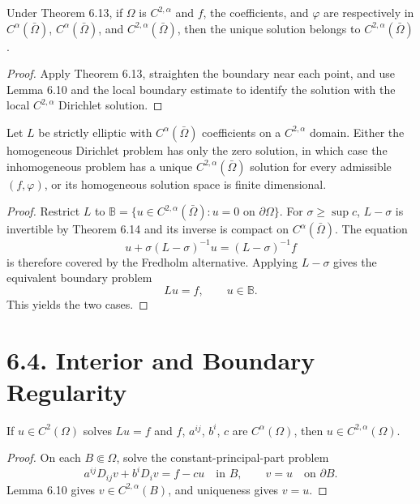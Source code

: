 \begin{theorem}
\label{gt-ch06-thm-6-14}
Under Theorem 6.13, if $\Omega$ is $C^{2,\alpha}$ and
$f$, the coefficients, and $\varphi$ are respectively in
$C^\alpha(\bar\Omega)$, $C^\alpha(\bar\Omega)$, and $C^{2,\alpha}(\bar\Omega)$,
then the unique solution belongs to $C^{2,\alpha}(\bar\Omega)$.
\end{theorem}
\begin{proof}
\sketch Apply Theorem 6.13, straighten the boundary near each point, and use
Lemma 6.10 and the local boundary estimate to identify the solution with the
local $C^{2,\alpha}$ Dirichlet solution.
\end{proof}

\begin{theorem}
\label{gt-ch06-thm-6-15}
Let $L$ be strictly elliptic with $C^\alpha(\bar\Omega)$ coefficients on a
$C^{2,\alpha}$ domain.  Either the homogeneous Dirichlet problem has only the
zero solution, in which case the inhomogeneous problem has a unique
$C^{2,\alpha}(\bar\Omega)$ solution for every admissible $(f,\varphi)$, or its
homogeneous solution space is finite dimensional.
\end{theorem}
\begin{proof}
\sketch Restrict $L$ to $\mathbb B=\{u\in C^{2,\alpha}(\bar\Omega):u=0\text{ on }
\partial\Omega\}$.  For $\sigma\ge\sup c$, $L-\sigma$ is invertible by Theorem
6.14 and its inverse is compact on $C^\alpha(\bar\Omega)$.  The equation
\begin{equation}\tag{6.46}
u+\sigma(L-\sigma)^{-1}u=(L-\sigma)^{-1}f
\end{equation}
is therefore covered by the Fredholm alternative. Applying $L-\sigma$ gives
the equivalent boundary problem
\begin{equation}
\tag{6.47}
Lu=f,\qquad u\in\mathbb B.
\end{equation}
This yields the two cases.
\end{proof}

\section*{6.4. Interior and Boundary Regularity}

\begin{lemma}
\label{gt-ch06-lem-6-16}
If $u\in C^2(\Omega)$ solves $Lu=f$ and $f$, $a^{ij}$, $b^i$, $c$ are
$C^\alpha(\Omega)$, then $u\in C^{2,\alpha}(\Omega)$.
\end{lemma}
\begin{proof}
\sketch On each $B\Subset\Omega$, solve the constant-principal-part problem
\begin{equation}\tag{6.48}
a^{ij}D_{ij}v+b^iD_iv=f-cu\quad\text{in }B,\qquad v=u\quad\text{on }\partial B.
\end{equation}
Lemma 6.10 gives $v\in C^{2,\alpha}(B)$, and uniqueness gives $v=u$.
\end{proof}

